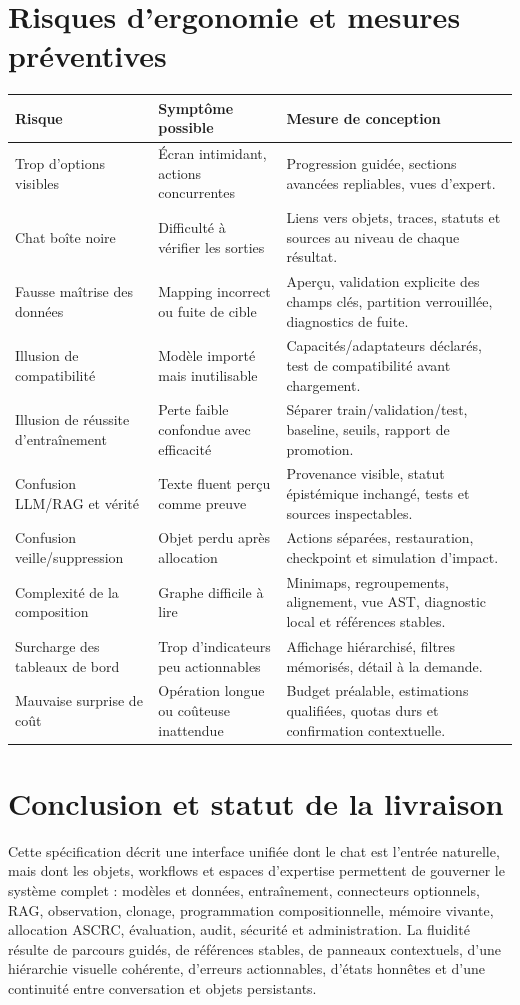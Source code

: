 \documentclass[11pt,a4paper]{article}
\begin{document}
\section{Risques d'ergonomie et mesures préventives}
\begin{longtable}{p{}p{}p{}}
\toprule
\textbf{Risque} & \textbf{Symptôme possible} & \textbf{Mesure de conception}\\
\midrule
Trop d'options visibles & Écran intimidant, actions concurrentes & Progression guidée, sections avancées repliables, vues d'expert.\\
Chat boîte noire & Difficulté à vérifier les sorties & Liens vers objets, traces, statuts et sources au niveau de chaque résultat.\\
Fausse maîtrise des données & Mapping incorrect ou fuite de cible & Aperçu, validation explicite des champs clés, partition verrouillée, diagnostics de fuite.\\
Illusion de compatibilité & Modèle importé mais inutilisable & Capacités/adaptateurs déclarés, test de compatibilité avant chargement.\\
Illusion de réussite d'entraînement & Perte faible confondue avec efficacité & Séparer train/validation/test, baseline, seuils, rapport de promotion.\\
Confusion LLM/RAG et vérité & Texte fluent perçu comme preuve & Provenance visible, statut épistémique inchangé, tests et sources inspectables.\\
Confusion veille/suppression & Objet perdu après allocation & Actions séparées, restauration, checkpoint et simulation d'impact.\\
Complexité de la composition & Graphe difficile à lire & Minimaps, regroupements, alignement, vue AST, diagnostic local et références stables.\\
Surcharge des tableaux de bord & Trop d'indicateurs peu actionnables & Affichage hiérarchisé, filtres mémorisés, détail à la demande.\\
Mauvaise surprise de coût & Opération longue ou coûteuse inattendue & Budget préalable, estimations qualifiées, quotas durs et confirmation contextuelle.\\
\bottomrule
\end{longtable}

\section{Conclusion et statut de la livraison}
Cette spécification décrit une interface unifiée dont le chat est l'entrée naturelle, mais dont les objets, workflows et espaces d'expertise permettent de gouverner le système complet : modèles et données, entraînement, connecteurs optionnels, RAG, observation, clonage, programmation compositionnelle, mémoire vivante, allocation ASCRC, évaluation, audit, sécurité et administration. La fluidité résulte de parcours guidés, de références stables, de panneaux contextuels, d'une hiérarchie visuelle cohérente, d'erreurs actionnables, d'états honnêtes et d'une continuité entre conversation et objets persistants.
\end{document}
